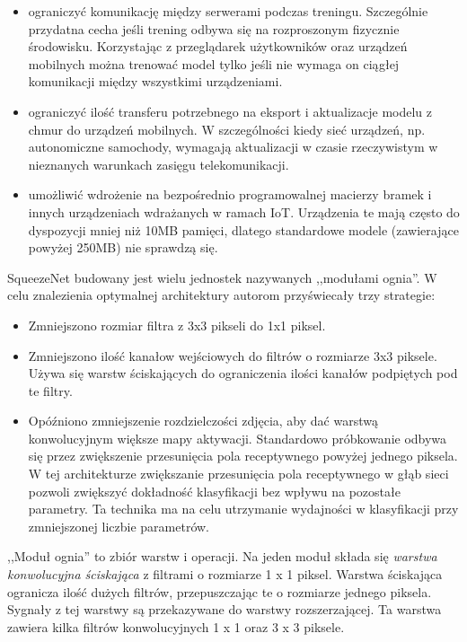 \documentclass[12pt,a4paper,twoside,titlepage,openright]{book}
\begin{document}
\begin{itemize}
\item ograniczyć komunikację między serwerami podczas treningu. Szczególnie przydatna cecha jeśli trening odbywa się na rozproszonym fizycznie środowisku. Korzystając z przeglądarek użytkowników oraz urządzeń mobilnych można trenować model tylko jeśli nie wymaga on ciągłej komunikacji między wszystkimi urządzeniami.
\item ograniczyć ilość transferu potrzebnego na eksport i aktualizacje modelu z chmur do urządzeń mobilnych. W szczególności kiedy sieć urządzeń, np. autonomiczne samochody, wymagają aktualizacji w czasie rzeczywistym w nieznanych warunkach zasięgu telekomunikacji.
\item umożliwić wdrożenie na bezpośrednio programowalnej macierzy bramek i innych urządzeniach wdrażanych w ramach IoT. Urządzenia te mają często do dyspozycji mniej niż 10MB pamięci, dlatego standardowe modele (zawierające powyżej 250MB) nie sprawdzą się.
\end{itemize}

SqueezeNet budowany jest wielu jednostek nazywanych ,,modułami ognia''. 
W celu znalezienia optymalnej architektury autorom przyświecały trzy strategie:
\begin{itemize}
\item Zmniejszono rozmiar filtra z 3x3 pikseli do 1x1 piksel.
\item Zmniejszono ilość kanałow wejściowych do filtrów o rozmiarze 3x3 piksele. Używa się warstw ściskających do ograniczenia ilości kanałów podpiętych pod te filtry.
\item Opóźniono zmniejszenie rozdzielczości zdjęcia, aby dać warstwą konwolucyjnym większe mapy aktywacji. Standardowo próbkowanie odbywa się przez zwiększenie przesunięcia pola receptywnego powyżej jednego piksela. W tej architekturze zwiększanie przesunięcia pola receptywnego w głąb sieci pozwoli zwiększyć dokładność klasyfikacji bez wpływu na pozostałe parametry. Ta technika ma na celu utrzymanie wydajności w klasyfikacji przy zmniejszonej liczbie parametrów.
\end{itemize}

,,Moduł ognia'' to zbiór warstw i operacji. Na jeden moduł składa się \textit{warstwa konwolucyjna ściskająca} z filtrami o rozmiarze 1 x 1 piksel. Warstwa ściskająca ogranicza ilość dużych filtrów, przepuszczając te o rozmiarze jednego piksela. Sygnały z tej warstwy są przekazywane do warstwy rozszerzającej. Ta warstwa zawiera kilka filtrów konwolucyjnych 1 x 1 oraz 3 x 3 piksele. 
\end{document}
